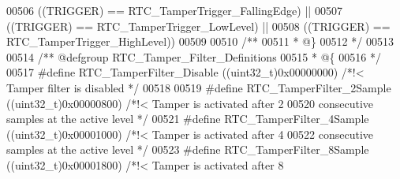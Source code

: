 \begin{DoxyCode}
00506                                         \textcolor{preprocessor}{(}\textcolor{preprocessor}{(}\textcolor{preprocessor}{TRIGGER}\textcolor{preprocessor}{)} \textcolor{preprocessor}{==} 
      RTC_TamperTrigger_FallingEdge\textcolor{preprocessor}{)} \textcolor{preprocessor}{||}
00507                                         \textcolor{preprocessor}{(}\textcolor{preprocessor}{(}\textcolor{preprocessor}{TRIGGER}\textcolor{preprocessor}{)} \textcolor{preprocessor}{==} 
      RTC_TamperTrigger_LowLevel\textcolor{preprocessor}{)} \textcolor{preprocessor}{||}
00508                                         \textcolor{preprocessor}{(}\textcolor{preprocessor}{(}\textcolor{preprocessor}{TRIGGER}\textcolor{preprocessor}{)} \textcolor{preprocessor}{==} 
      RTC_TamperTrigger_HighLevel\textcolor{preprocessor}{)}\textcolor{preprocessor}{)}
00509 
00510 \textcolor{comment}{/**}
00511 \textcolor{comment}{  * @\}}
00512 \textcolor{comment}{  */}
00513 
00514 \textcolor{comment}{/** @defgroup RTC\_Tamper\_Filter\_Definitions }
00515 \textcolor{comment}{  * @\{}
00516 \textcolor{comment}{  */}
00517 \textcolor{preprocessor}{#}\textcolor{preprocessor}{define} \textcolor{preprocessor}{RTC\_TamperFilter\_Disable}   \textcolor{preprocessor}{(}\textcolor{preprocessor}{(}\textcolor{preprocessor}{uint32\_t}\textcolor{preprocessor}{)}0x00000000\textcolor{preprocessor}{)} \textcolor{comment}{/*!< Tamper filter is disabled */}
00518 
00519 \textcolor{preprocessor}{#}\textcolor{preprocessor}{define} \textcolor{preprocessor}{RTC\_TamperFilter\_2Sample}   \textcolor{preprocessor}{(}\textcolor{preprocessor}{(}\textcolor{preprocessor}{uint32\_t}\textcolor{preprocessor}{)}0x00000800\textcolor{preprocessor}{)} \textcolor{comment}{/*!< Tamper is activated after 2 }
00520 \textcolor{comment}{                                                          consecutive samples at the active level */}
00521 \textcolor{preprocessor}{#}\textcolor{preprocessor}{define} \textcolor{preprocessor}{RTC\_TamperFilter\_4Sample}   \textcolor{preprocessor}{(}\textcolor{preprocessor}{(}\textcolor{preprocessor}{uint32\_t}\textcolor{preprocessor}{)}0x00001000\textcolor{preprocessor}{)} \textcolor{comment}{/*!< Tamper is activated after 4 }
00522 \textcolor{comment}{                                                          consecutive samples at the active level */}
00523 \textcolor{preprocessor}{#}\textcolor{preprocessor}{define} \textcolor{preprocessor}{RTC\_TamperFilter\_8Sample}   \textcolor{preprocessor}{(}\textcolor{preprocessor}{(}\textcolor{preprocessor}{uint32\_t}\textcolor{preprocessor}{)}0x00001800\textcolor{preprocessor}{)} \textcolor{comment}{/*!< Tamper is activated after 8 }

\end{DoxyCode}
